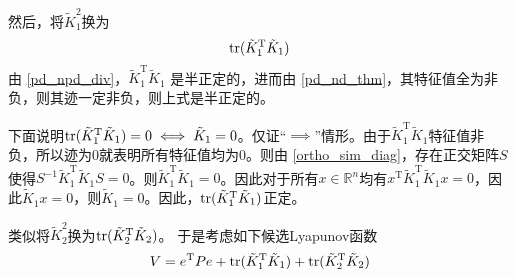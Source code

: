 然后，将$\tilde{K}_1^2$换为\[\operatorname{tr}(\tilde{K}_1^\mathrm{T}\tilde{K}_1)\]
由 \ref{pd_npd_div}，$\tilde{K}_1^\mathrm{T}\tilde{K}_1$ 是半正定的，进而由 \ref{pd_nd_thm}，其特征值全为非负，则其迹一定非负，则上式是半正定的。

下面说明$\operatorname{tr}(\tilde{K}_1^\mathrm{T}\tilde{K}_1)=0\iff \tilde{K}_1=0$。仅证“$\implies$”情形。由于$\tilde{K}_1^\mathrm{T}\tilde{K}_1$特征值非负，所以迹为$0$就表明所有特征值均为$0$。则由 \ref{ortho_sim_diag}，存在正交矩阵$S$使得$S^{-1}\tilde{K}_1^\mathrm{T}\tilde{K}_1S=0$。则$\tilde{K}_1^\mathrm{T}\tilde{K}_1=0$。因此对于所有$x\in\mathbb{R}^{n}$均有$x^{\mathrm{T}}\tilde{K}_1^\mathrm{T}\tilde{K}_1x=0$，因此$\tilde{K}_1x=0$，则$\tilde{K}_1=0$。因此，$\operatorname{tr}(\tilde{K}_1^\mathrm{T}\tilde{K}_1)$正定。

类似将$\tilde{K}_2^2$换为$\operatorname{tr}(\tilde{K}_2^\mathrm{T}\tilde{K}_2)$。
于是考虑如下候选Lyapunov函数
\begin{equation}\label{MODMIMOLYA:modify1}
V=e^\mathrm{T}Pe+\operatorname{tr}(\tilde{K}_1^\mathrm{T}\tilde{K}_1)+\operatorname{tr}(\tilde{K}_2^\mathrm{T}\tilde{K}_2)
\end{equation}

